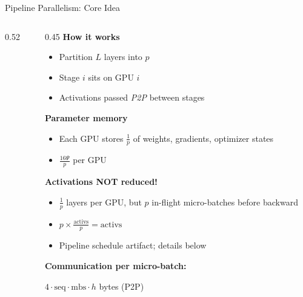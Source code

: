 \begin{frame}{Pipeline Parallelism: Core Idea}
\begin{columns}
\begin{column}{0.52\textwidth}
\begin{center}
      \end{center}
    \end{column}
    \begin{column}{0.45\textwidth}
      \textbf{How it works}
      \begin{itemize}
        \item Partition $L$ layers into $p$ 
        \item Stage $i$ sits on GPU $i$
        \item Activations passed \emph{P2P} between stages
      \end{itemize}

      \vspace{0.2em}
      \textbf{Parameter memory}
      \begin{itemize}
        \item Each GPU stores $\frac{1}{p}$ of weights, gradients, optimizer states
        \item $\frac{16\Psi}{p}$ per GPU
      \end{itemize}

      \vspace{0.2em}
      \textbf{Activations NOT reduced!}
      \begin{itemize}
        \item $\frac{1}{p}$ layers per GPU, but $p$ in-flight micro-batches before backward
        \item $p \times \frac{\text{activs}}{p} = \text{activs}$
        \item Pipeline schedule artifact; details below
      \end{itemize}

      \vspace{0.2em}
      \textbf{Communication per micro-batch:}\par
      {\small $4 \cdot \text{seq} \cdot \text{mbs} \cdot h$ bytes (P2P)}
    \end{column}
  \end{columns}
\end{frame}

